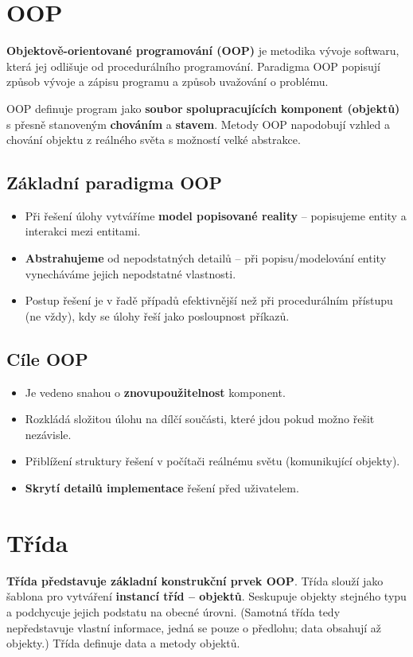 \section{OOP}
\textbf{Objektově-orientované programování (OOP)} je metodika vývoje softwaru, která jej odlišuje od procedurálního programování. Paradigma OOP popisují způsob vývoje a zápisu programu a způsob uvažování o problému.

OOP definuje program jako \textbf{soubor} \textbf{spolupracujících komponent (objektů)} s přesně stanoveným \textbf{chováním} a \textbf{stavem}. Metody OOP napodobují vzhled a chování objektu z reálného světa s možností velké abstrakce.

\subsection{Základní paradigma OOP}
\begin{itemize}
    \item Při řešení úlohy vytváříme \textbf{model popisované reality} -- popisujeme entity a interakci mezi entitami.
    \item \textbf{Abstrahujeme} od nepodstatných detailů -- při popisu/modelování entity vynecháváme jejich nepodstatné vlastnosti.
    \item Postup řešení je v řadě případů efektivnější než při procedurálním přístupu (ne vždy), kdy se úlohy řeší jako posloupnost příkazů.
\end{itemize}

\subsection{Cíle OOP}
\begin{itemize}
    \item Je vedeno snahou o \textbf{znovupoužitelnost} komponent.
    \item Rozkládá složitou úlohu na dílčí součásti, které jdou pokud možno řešit nezávisle.
    \item Přiblížení struktury řešení v počítači reálnému světu (komunikující objekty).
    \item \textbf{Skrytí detailů implementace} řešení před uživatelem.
\end{itemize}

\section{Třída}
\textbf{Třída představuje základní konstrukční prvek OOP}. Třída slouží jako šablona pro vytváření \textbf{instancí tříd -- objektů}. Seskupuje objekty stejného typu a podchycuje jejich podstatu na obecné úrovni.  (Samotná třída tedy nepředstavuje vlastní informace, jedná se pouze o předlohu; data obsahují až objekty.) Třída definuje data a metody objektů. \textbf{}

